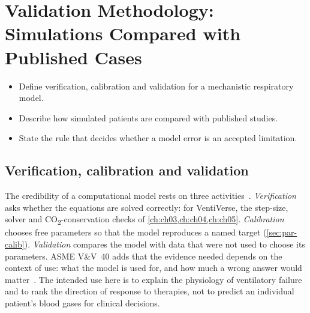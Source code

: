 \chapter{Validation Methodology: Simulations Compared with Published Cases}
\label{ch:ch14}

\begin{objectives}
\begin{itemize}[leftmargin=*]
  \item Define verification, calibration and validation for a mechanistic respiratory model.
  \item Describe how simulated patients are compared with published studies.
  \item State the rule that decides whether a model error is an accepted limitation.
\end{itemize}
\end{objectives}

\section{Verification, calibration and validation}
\label{sec:val-terms}
The credibility of a computational model rests on three activities~\citep{asme_vv40,oberkampf2010}. \emph{Verification} asks whether the equations are solved correctly: for VentiVerse, the step-size, solver and CO\textsubscript{2}-conservation checks of \cref{ch:ch03,ch:ch04,ch:ch05}. \emph{Calibration} chooses free parameters so that the model reproduces a named target (\cref{sec:par-calib}). \emph{Validation} compares the model with data that were not used to choose its parameters. ASME V\&V~40 adds that the evidence needed depends on the context of use: what the model is used for, and how much a wrong answer would matter~\citep{asme_vv40}. The intended use here is to explain the physiology of ventilatory failure and to rank the direction of response to therapies, not to predict an individual patient's blood gases for clinical decisions.

